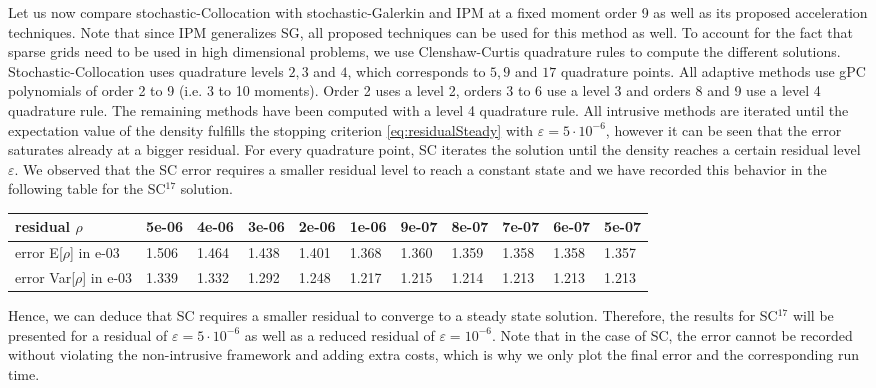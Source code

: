 Let us now compare stochastic-Collocation with stochastic-Galerkin and IPM at a fixed moment order 9 as well as its proposed acceleration techniques. Note that since IPM generalizes SG, all proposed techniques can be used for this method as well. To account for the fact that sparse grids need to be used in high dimensional problems, we use Clenshaw-Curtis quadrature rules to compute the different solutions. Stochastic-Collocation uses quadrature levels $2,3$ and $4$, which corresponds to $5,9$ and $17$ quadrature points. All adaptive methods use gPC polynomials of order 2 to 9 (i.e. 3 to 10 moments). Order 2 uses a level 2, orders 3 to 6 use a level 3 and orders 8 and 9 use a level 4 quadrature rule. The remaining methods have been computed with a level 4 quadrature rule. All intrusive methods are iterated until the expectation value of the density fulfills the stopping criterion \eqref{eq:residualSteady} with $\varepsilon = 5\cdot 10^{-6}$, however it can be seen that the error saturates already at a bigger residual. For every quadrature point, SC iterates the solution until the density reaches a certain residual level $\varepsilon$.  We observed that the SC error requires a smaller residual level to reach a constant state and we have recorded this behavior in the following table for the SC$^{17}$ solution.
\begin{center}
\begin{tabular}{ | m{3cm} || m{0.9cm} | m{0.9cm} | m{0.9cm} | m{0.9cm} | m{0.9cm} | m{0.9cm} | m{0.9cm} | m{0.9cm} | m{0.9cm} | m{0.9cm} | } 
\hline
residual $\rho$ & 5e-06 & 4e-06 & 3e-06 & 2e-06 & 1e-06 & 9e-07 & 8e-07 & 7e-07 & 6e-07 & 5e-07  \\ 
\hline
error E[$\rho$] in e-03 & 1.506 & 1.464 & 1.438 & 1.401 & 1.368 & 1.360 & 1.359 & 1.358 & 1.358 & 1.357  \\ 
\hline
error Var[$\rho$] in e-03 & 1.339 & 1.332 & 1.292 & 1.248 & 1.217 & 1.215 & 1.214 & 1.213 & 1.213 & 1.213  \\ 
\hline
\end{tabular}
\end{center}
Hence, we can deduce that SC requires a smaller residual to converge to a steady state solution. Therefore, the results for SC$^{17}$ will be presented for a residual of $\varepsilon = 5\cdot 10^{-6}$ as well as a reduced residual of $\varepsilon = 10^{-6}$. Note that in the case of SC, the error cannot be recorded without violating the non-intrusive framework and adding extra costs, which is why we only plot the final error and the corresponding run time.    %
